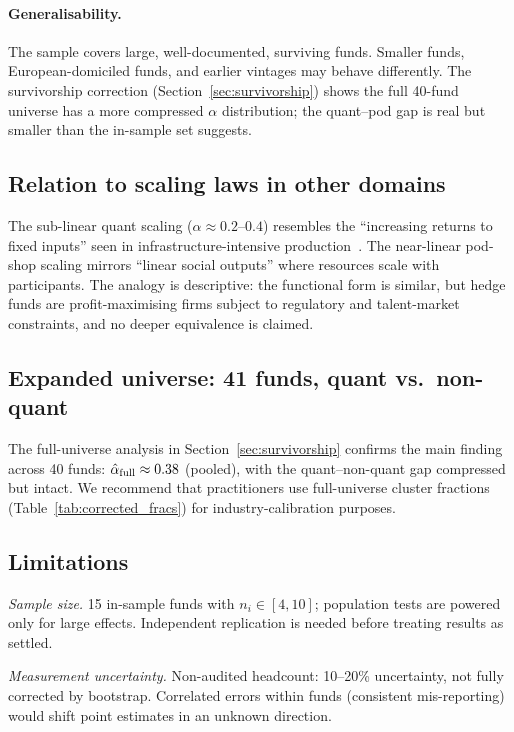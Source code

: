 \documentclass[12pt]{article}
\newcommand{\alphahat}{\hat{\alpha}}
\begin{document}
\paragraph{Generalisability.}
The sample covers large, well-documented, surviving funds.
Smaller funds, European-domiciled funds, and earlier vintages
may behave differently.
The survivorship correction (Section~\ref{sec:survivorship})
shows the full 40-fund universe has a more compressed
$\alpha$ distribution; the quant--pod gap is real but smaller
than the in-sample set suggests.

\subsection{Relation to scaling laws in other domains}

The sub-linear quant scaling ($\alpha \approx 0.2$--$0.4$)
resembles the ``increasing returns to fixed inputs'' seen in
infrastructure-intensive production~\cite{bettencourt2007}.
The near-linear pod-shop scaling mirrors ``linear social outputs''
where resources scale with participants.
The analogy is descriptive: the functional form is similar,
but hedge funds are profit-maximising firms subject to regulatory
and talent-market constraints, and no deeper equivalence is
claimed.

\subsection{Expanded universe: 41 funds, quant vs.\ non-quant}

The full-universe analysis in Section~\ref{sec:survivorship}
confirms the main finding across 40 funds:
$\alphahat_{\rm full} \approx 0.38$ (pooled),
with the quant--non-quant gap compressed but intact.
We recommend that practitioners use full-universe cluster
fractions (Table~\ref{tab:corrected_fracs}) for
industry-calibration purposes.

\subsection{Limitations}

\textit{Sample size.}
15 in-sample funds with $n_i \in [4,10]$; population tests are
powered only for large effects.
Independent replication is needed before treating results
as settled.

\textit{Measurement uncertainty.}
Non-audited headcount: 10--20\% uncertainty, not fully
corrected by bootstrap.
Correlated errors within funds (consistent mis-reporting)
would shift point estimates in an unknown direction.
\end{document}
